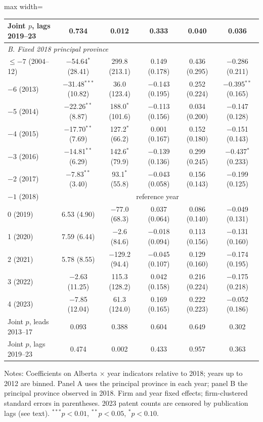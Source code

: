 \begin{table}[htbp]
\begin{adjustbox}{max width=\textwidth}
\begin{tabular}{lccccc}
Joint $p$, lags 2019--23 & 0.734 & 0.012 & 0.333 & 0.040 & 0.036 \\
\midrule
\multicolumn{6}{l}{\textit{B. Fixed 2018 principal province}} \\
$\leq-7$ (2004--12) & $-$54.64$^{*}$ (28.41) & 299.8 (213.1) & 0.149 (0.178) & 0.436 (0.295) & $-$0.286 (0.211) \\
$-$6 (2013) & $-$31.48$^{***}$ (10.82) & 36.0 (123.4) & $-$0.143 (0.195) & 0.252 (0.224) & $-$0.395$^{**}$ (0.165) \\
$-$5 (2014) & $-$22.26$^{**}$ (8.87) & 188.0$^{*}$ (101.6) & $-$0.113 (0.156) & 0.034 (0.200) & $-$0.147 (0.128) \\
$-$4 (2015) & $-$17.70$^{**}$ (7.69) & 127.2$^{*}$ (66.2) & 0.001 (0.167) & 0.152 (0.180) & $-$0.151 (0.143) \\
$-$3 (2016) & $-$14.81$^{**}$ (6.29) & 142.6$^{*}$ (79.9) & $-$0.139 (0.136) & 0.299 (0.245) & $-$0.437$^{*}$ (0.233) \\
$-$2 (2017) & $-$7.83$^{**}$ (3.40) & 93.1$^{*}$ (55.8) & $-$0.043 (0.058) & 0.156 (0.143) & $-$0.199 (0.125) \\
$-1$ (2018) & \multicolumn{5}{c}{reference year} \\
0 (2019) & 6.53 (4.90) & $-$77.0 (68.3) & 0.037 (0.064) & 0.086 (0.140) & $-$0.049 (0.131) \\
1 (2020) & 7.59 (6.44) & $-$2.6 (84.6) & $-$0.018 (0.094) & 0.113 (0.156) & $-$0.131 (0.160) \\
2 (2021) & 5.78 (8.55) & $-$129.2 (94.4) & $-$0.045 (0.107) & 0.129 (0.160) & $-$0.174 (0.195) \\
3 (2022) & $-$2.63 (11.25) & 115.3 (128.2) & 0.042 (0.158) & 0.216 (0.224) & $-$0.175 (0.218) \\
4 (2023) & $-$7.85 (12.04) & 61.3 (124.0) & 0.169 (0.165) & 0.222 (0.223) & $-$0.052 (0.186) \\
\midrule
Joint $p$, leads 2013--17 & 0.093 & 0.388 & 0.604 & 0.649 & 0.302 \\
Joint $p$, lags 2019--23 & 0.474 & 0.002 & 0.433 & 0.957 & 0.363 \\
\bottomrule
\end{tabular}
\end{adjustbox}
\par\vspace{3pt}\begin{minipage}{\textwidth}\scriptsize
Notes: Coefficients on Alberta $\times$ year indicators relative to 2018; years up to 2012 are binned. Panel A uses the principal province in each year; panel B the principal province observed in 2018. Firm and year fixed effects; firm-clustered standard errors in parentheses. 2023 patent counts are censored by publication lags (see text). $^{***}p<0.01$, $^{**}p<0.05$, $^{*}p<0.10$.
\end{minipage}
\end{table}
